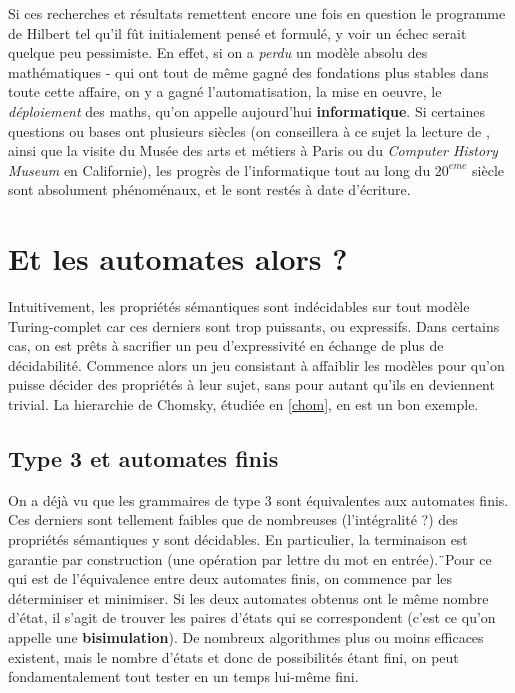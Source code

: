 Si ces recherches et résultats remettent encore une fois en question le programme de Hilbert tel qu'il fût initialement pensé et formulé, y voir un échec serait quelque peu pessimiste. En effet, si on a \textit{perdu} un modèle absolu des mathématiques - qui ont tout de même gagné des fondations plus stables dans toute cette affaire, on y a gagné l'automatisation, la mise en oeuvre, le \textit{déploiement} des maths, qu'on appelle aujourd'hui \textbf{informatique}. Si certaines questions ou bases ont plusieurs siècles (on conseillera à ce sujet la lecture de \cite{montaigne}, ainsi que la visite du Musée des arts et métiers à Paris ou du \textit{Computer History Museum} en Californie), les progrès de l'informatique tout au long du $20^{eme}$ siècle sont absolument phénoménaux, et le sont restés à date d'écriture. 



\section{Et les automates alors ?}
\label{autoalors}



Intuitivement, les propriétés sémantiques sont indécidables sur tout modèle Turing-complet car ces derniers sont trop puissants, ou expressifs. Dans certains cas, on est prêts à sacrifier un peu d'expressivité en échange de plus de décidabilité.
Commence alors un jeu consistant à affaiblir les modèles pour qu'on puisse décider des propriétés à leur sujet, sans pour autant qu'ils en deviennent trivial. 
La hierarchie de Chomsky, étudiée en \ref{chom}, en est un bon exemple. 

\subsection{Type 3 et automates finis}

On a déjà vu que les grammaires de type 3 sont équivalentes aux automates finis. Ces derniers sont tellement faibles que de nombreuses (l'intégralité ?) des propriétés sémantiques y sont décidables. En particulier, la terminaison est garantie par construction (une opération par lettre du mot en entrée).¨Pour ce qui est de l'équivalence entre deux automates finis, on commence par les déterminiser et minimiser. Si les deux automates obtenus ont le même nombre d'état, il s'agit de trouver les paires d'états qui se correspondent (c'est ce qu'on appelle une \textbf{bisimulation}). De nombreux algorithmes plus ou moins efficaces existent, mais le nombre d'états et donc de possibilités étant fini, on peut fondamentalement tout tester en un temps lui-même fini.

